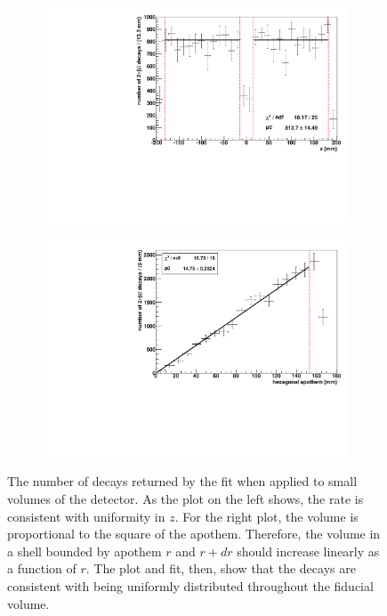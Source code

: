 \documentclass[herrin-thesis.tex]{subfiles}
\begin{document}
\begin{figure}[htbp]
	\begin{subfigure}[c]{0.48\textwidth}
	\centering
	\includegraphics[width=\textwidth]{./plots/analysis_bb2n_rate_v_z.pdf}
	\end{subfigure}\hfill%
	\begin{subfigure}[c]{0.48\textwidth}
	\centering
	\includegraphics[width=\textwidth]{./plots/analysis_bb2n_rate_v_apothem.pdf}
	\end{subfigure}
\caption[Number of \twonu{} decays vs. position]{The number of \twonu{} decays returned by the fit when applied to small volumes of the detector. As the plot on the left shows, the rate is consistent with uniformity in \(z\). For the right plot, the volume is proportional to the square of the apothem. Therefore, the volume in a shell bounded by apothem \(r\) and \(r+dr\) should increase linearly as a function of \(r\). The plot and fit, then, show that the \twonu{} decays are consistent with being uniformly distributed throughout the fiducial volume.}
\label{fig:analysis_bb2n_rate_v_pos}
\end{figure}
\end{document}
